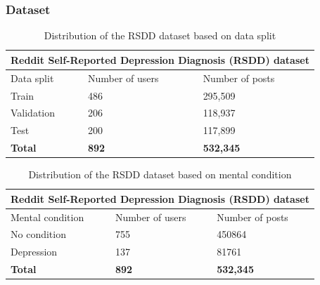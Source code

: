 \documentclass{beamer}
\begin{document}
\begin{frame}
	\frametitle{Dataset}	
	
	\begin{table}[h!]
		\centering
		\begin{tabular}{|p{3cm}|p{3cm}|p{3cm}|} 
			\hline
			\multicolumn{3}{|c|}{Reddit Self-Reported Depression Diagnosis (RSDD) dataset}\\
			\hline
			Data split & Number of users & Number of posts \\ [0.5ex] 
			\hline
			Train & 486 & 295,509 \\ 
			Validation  & 206 & 118,937 \\ 
			Test & 200 & 117,899  \\
			\hline
			\textbf{Total} & \textbf{892} & \textbf{532,345}\\
			\hline
		\end{tabular}
		\caption{Distribution of the RSDD dataset based on data split}
		\label{Table:1}
	\end{table}

\begin{table}[h!]
	\centering
	\begin{tabular}{|p{3cm}|p{3cm}|p{3cm}|} 
		\hline
		\multicolumn{3}{|c|}{Reddit Self-Reported Depression Diagnosis (RSDD) dataset}\\
		\hline
		Mental condition & Number of users & Number of posts \\ [0.5ex] 
		\hline
		No condition & 755 & 450864 \\ 
		Depression  & 137 & 81761 \\ 
		\hline
		\textbf{Total} & \textbf{892} & \textbf{532,345}\\
		\hline
	\end{tabular}
	\caption{Distribution of the RSDD dataset based on mental condition}
	\label{Table:1}
\end{table}
\end{frame}
\end{document}
